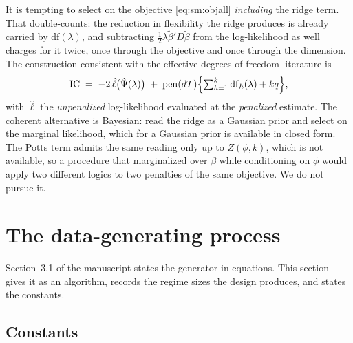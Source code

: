 \documentclass[11pt]{article}
\begin{document}
It is tempting to select on the objective \eqref{eq:sm:objall} \emph{including} the ridge term. That double-counts: the reduction in flexibility the ridge produces is already carried by $\mathrm{df}(\lambda)$, and subtracting $\tfrac12\lambda\tilde\beta'D\tilde\beta$ from the log-likelihood as well charges for it twice, once through the objective and once through the dimension. The construction consistent with the effective-degrees-of-freedom literature is
\begin{equation}\label{eq:sm:icfinal}
  \mathrm{IC} \;=\; -2\,\hat\ell\bigl(\hat\Psi(\lambda)\bigr)
  \;+\; \mathrm{pen}(dT)\Bigl\{\textstyle\sum_{h=1}^k \mathrm{df}_h(\lambda) + kq\Bigr\},
\end{equation}
with $\hat\ell$ the \emph{unpenalized} log-likelihood evaluated at the \emph{penalized} estimate. The coherent alternative is Bayesian: read the ridge as a Gaussian prior and select on the marginal likelihood, which for a Gaussian prior is available in closed form. The Potts term admits the same reading only up to $Z(\phi,k)$, which is not available, so a procedure that marginalized over $\beta$ while conditioning on $\phi$ would apply two different logics to two penalties of the same objective. We do not pursue it.

\section{The data-generating process}\label{supp:dgp}\label{sm:designs}

Section~3.1 of the manuscript states the generator in equations. This section gives it as an algorithm, records the regime sizes the design produces, and states the constants.

\subsection{Constants}
\end{document}
